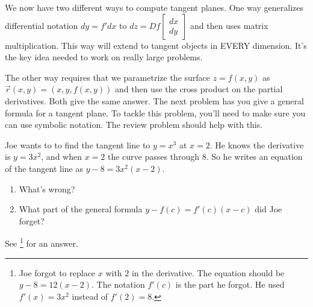 %


\indent We now have two different ways to compute tangent planes.  One way generalizes differential notation $dy=f'dx$ to 
$dz = Df \begin{bmatrix}dx\\dy\end{bmatrix}$ and then uses matrix multiplication. This way will extend to tangent objects in EVERY dimension.  It's the key idea needed to work on really large problems.  

\indent The other way requires that we parametrize the surface $z=f(x,y)$ as $\vec r(x,y)=(x,y,f(x,y))$ and then use the cross product on the partial derivatives. Both give the same answer. The next problem has you give a general formula for a tangent plane.  To tackle this problem, you'll need to make sure you can use symbolic notation.  The review problem should help with this.

\begin{review*}
 Joe wants to to find the tangent line to $y=x^3$ at $x=2$.  He knows the derivative is $y=3x^2$, and when $x=2$ the curve passes through $8$.  So he writes an equation of the tangent line as $y-8=3x^2(x-2)$. 
	\begin{enumerate}[a]
		\item What's wrong?  
		\item What part of the general formula $y-f(c) = f'(c) (x-c)$ did Joe forget?  
	\end{enumerate}
See \footnote{Joe forgot to replace $x$ with $2$ in the derivative. The equation should be $y-8=12(x-2)$.  The notation $f'(c)$ is the part he forgot.  He used $f'(x)=3x^2$ instead of $f'(2)=8$.} for an answer.

\end{review*}



